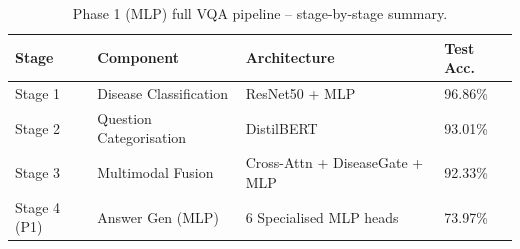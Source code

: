 \begin{table}[H]
\centering
\caption{Phase 1 (MLP) full VQA pipeline -- stage-by-stage summary.}
\label{tab:p1_pipeline}
\begin{tabular}{llll}
\toprule
\textbf{Stage} & \textbf{Component} & \textbf{Architecture} & \textbf{Test Acc.} \\
\midrule
Stage 1 & Disease Classification & ResNet50 + MLP & 96.86\% \\
Stage 2 & Question Categorisation & DistilBERT & 93.01\% \\
Stage 3 & Multimodal Fusion & Cross-Attn + DiseaseGate + MLP & 92.33\% \\
Stage 4 (P1) & Answer Gen (MLP) & 6 Specialised MLP heads & 73.97\% \\
\bottomrule
\end{tabular}
\end{table}
